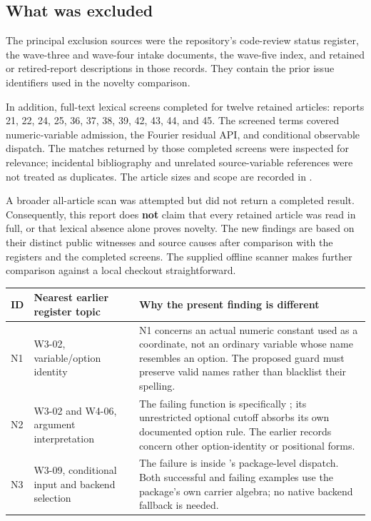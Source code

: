 \documentclass[11pt,letterpaper]{article}
\newcommand{\code}[1]{\texttt{\detokenize{#1}}}
\newcommand{\file}[1]{\path{#1}}
\begin{document}
\subsection{What was excluded}

The principal exclusion sources were the repository's code-review status register, the wave-three and wave-four intake documents, the wave-five index, and retained or retired-report descriptions in those records. They contain the prior issue identifiers used in the novelty comparison.\cite{register,wave3,wave4,wave5}

In addition, full-text lexical screens completed for twelve retained articles: reports 21, 22, 24, 25, 36, 37, 38, 39, 42, 43, 44, and 45. The screened terms covered numeric-variable admission, the Fourier residual API, and conditional observable dispatch. The matches returned by those completed screens were inspected for relevance; incidental bibliography and unrelated source-variable references were not treated as duplicates. The article sizes and scope are recorded in \file{evidence/review_scope.json}.

A broader all-article scan was attempted but did not return a completed result. Consequently, this report does \textbf{not} claim that every retained article was read in full, or that lexical absence alone proves novelty. The new findings are based on their distinct public witnesses and source causes after comparison with the registers and the completed screens. The supplied offline scanner makes further comparison against a local checkout straightforward.

\begin{longtable}{@{}>{\raggedright\arraybackslash}p{}>{\raggedright\arraybackslash}p{}>{\raggedright\arraybackslash}p{}@{}}
\toprule ID & Nearest earlier register topic & Why the present finding is different\\
\midrule\endhead
N1 & W3-02, variable/option identity & N1 concerns an actual numeric constant used as a coordinate, not an ordinary variable whose name resembles an option. The proposed guard must preserve valid names rather than blacklist their spelling.\\[0.6em]
N2 & W3-02 and W4-06, argument interpretation & The failing function is specifically \code{FourierInverseResidual}; its unrestricted optional cutoff absorbs its own documented option rule. The earlier records concern other option-identity or positional forms.\\[0.6em]
N3 & W3-09, conditional input and backend selection & The failure is inside \code{SeriesObservable}'s package-level dispatch. Both successful and failing examples use the package's own carrier algebra; no native backend fallback is needed.\\
\bottomrule
\end{longtable}
\end{document}
